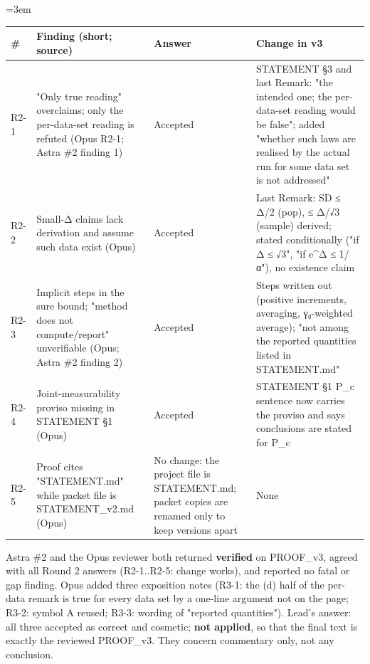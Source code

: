 \documentclass[11pt]{report}
\newenvironment{mdblock}{\begingroup\mdfont\raggedright\setlength{\parindent}{0pt}\setlength{\parskip}{0.55em}\emergencystretch=3em}{\par\endgroup}
\newcommand{\mdhead}[2]{\par\vspace{0.7em}\noindent{\bfseries\ifcase#1\or\large\or\normalsize\or\normalsize\or\small\or\small\or\small\fi #2}\par\nopagebreak\vspace{0.1em}}
\begin{document}
\begin{mdblock}
{\small
\begin{longtable}{|>{\raggedright\arraybackslash}p{}|>{\raggedright\arraybackslash}p{}|>{\raggedright\arraybackslash}p{}|>{\raggedright\arraybackslash}p{}|}
\hline
\textbf{\#} & \textbf{Finding (short; source)} & \textbf{Answer} & \textbf{Change in v3} \\ \hline\endhead
R2-1 & "Only true reading" overclaims; only the per-data-set reading is refuted (Opus R2-1; Astra \#2 finding 1) & Accepted & STATEMENT §3 and last Remark: "the intended one; the per-data-set reading would be false"; added "whether such laws are realised by the actual run for some data set is not addressed" \\ \hline
R2-2 & Small-Δ claims lack derivation and assume such data exist (Opus) & Accepted & Last Remark: SD ≤ Δ/2 (pop), ≤ Δ/√3 (sample) derived; stated conditionally ("if Δ ≤ √3", "if e\textasciicircum{}Δ ≤ 1/α"), no existence claim \\ \hline
R2-3 & Implicit steps in the sure bound; "method does not compute/report" unverifiable (Opus; Astra \#2 finding 2) & Accepted & Steps written out (positive increments, averaging, γ₀-weighted average); "not among the reported quantities listed in STATEMENT.md" \\ \hline
R2-4 & Joint-measurability proviso missing in STATEMENT §1 (Opus) & Accepted & STATEMENT §1 P\_c sentence now carries the proviso and says conclusions are stated for P\_c \\ \hline
R2-5 & Proof cites "STATEMENT.md" while packet file is STATEMENT\_v2.md (Opus) & No change: the project file is STATEMENT.md; packet copies are renamed only to keep versions apart & None \\ \hline
\end{longtable}}

\mdhead{2}{Round 3 (PROOF\_v3): confirmation}

Astra \#2 and the Opus reviewer both returned \textbf{verified} on PROOF\_v3, agreed with all Round 2 answers (R2-1..R2-5: change works), and reported no fatal or gap finding. Opus added three exposition notes (R3-1: the (d) half of the per-data remark is true for every data set by a one-line argument not on the page; R3-2: symbol A reused; R3-3: wording of "reported quantities"). Lead's answer: all three accepted as correct and cosmetic; \textbf{not applied}, so that the final text is exactly the reviewed PROOF\_v3. They concern commentary only, not any conclusion.
\end{mdblock}
\end{document}

